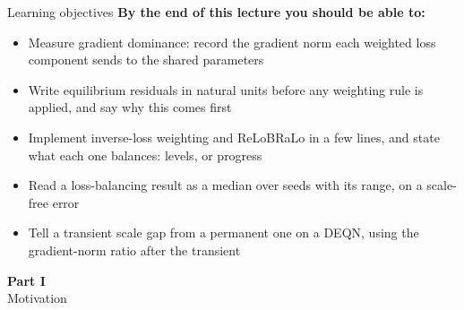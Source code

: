 \documentclass[aspectratio=169,11pt]{beamer}
\begin{document}
\begin{frame}{Learning objectives}
\textbf{By the end of this lecture you should be able to:}
\begin{itemize}
  \item Measure gradient dominance: record the gradient norm each weighted loss component sends to the shared parameters
  \item Write equilibrium residuals in natural units before any weighting rule is applied, and say why this comes first
  \item Implement inverse-loss weighting and ReLoBRaLo in a few lines, and state what each one balances: levels, or progress
  \item Read a loss-balancing result as a median over seeds with its range, on a scale-free error
  \item Tell a transient scale gap from a permanent one on a DEQN, using the gradient-norm ratio after the transient
\end{itemize}
\end{frame}



\begin{frame}[plain,c]
\begin{center}
{\Huge \textcolor{uzhblue}{\textbf{Part I}}}\\[12pt]
{\LARGE Motivation}
\end{center}
\end{frame}
\end{document}
